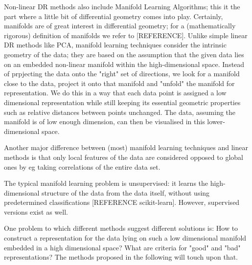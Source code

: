 \documentclass[journal, a4paper]{IEEEtran}
\begin{document}
Non-linear DR methods also include Manifold Learning Algorithms; this it the part where a little bit of differential geometry comes into play. Certainly, manifolds are of great interest in differential geometry; for a (mathematically rigorous) definition of manifolds we refer to [REFERENCE].
Unlike simple linear DR methods like PCA, manifold learning techniques consider the intrinsic geometry of the data; they are based on the assumption that the given data lies on an embedded non-linear manifold within the high-dimensional space. 
Instead of prpjecting the data onto the "right" set of directions, we look for a manifold close to the data, project it onto that manifold and "unfold" the manifold for representation. We do this in a way that each data point is assigned a low dimensional representation while still keeping its essential geometric properties such as relative distances between points unchanged.
The data, assuming the manifold is of low enough dimension, can then be visualised in this lower-dimensional space.

Another major difference between (most) manifold learning techniques and linear methods is that only local features of the data are considered opposed to global ones by eg taking correlations of the entire data set.

The typical manifold learning problem is unsupervised: it learns the high-dimensional structure of the data from the data itself, without using predetermined classifications [REFERENCE scikit-learn]. However, supervised versions exist as well.

One problem to which different methods suggest different solutions is: How to construct a representation for the data lying on such a low dimensional manifold embedded in a high dimensional space? What are criteria for "good" and "bad" representations? The methods proposed in the following will touch upon that.


\end{document}
